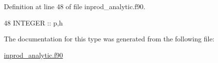 Definition at line 48 of file inprod\+\_\+analytic.\+f90.


\begin{DoxyCode}
48      \textcolor{keywordtype}{INTEGER} :: p,h
\end{DoxyCode}


The documentation for this type was generated from the following file\+:\begin{DoxyCompactItemize}
\item 
\hyperlink{inprod__analytic_8f90}{inprod\+\_\+analytic.\+f90}\end{DoxyCompactItemize}
